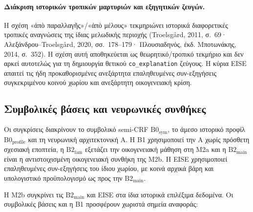 \documentclass[11pt,a4paper]{article}
\begin{document}
\paragraph{Διάκριση ιστορικών τροπικών μαρτυριών και εξηγητικών ζευγών.} Η σχέση «ἀπὸ παραλλαγῆς»/«ἀπὸ μέλους» τεκμηριώνει ιστορικά διαφορετικές τροπικές αναγνώσεις της ίδιας μελωδικής περιοχής (Troelsgård, 2011, σ.~69· Αλεξάνδρου--Troelsgård, 2020, σσ.~178--179· Πλουσιαδηνός, έκδ. Μποτωνάκης, 2014, σ.~352). Η σχέση αυτή αποθηκεύεται ως θεωρητικό/τροπικό τεκμήριο και δεν αρκεί αυτοτελώς για τη δημιουργία θετικού \texttt{co\_explanation} ζεύγους. Η κύρια EISE απαιτεί τις ήδη προκαθορισμένες ανεξάρτητα επαληθευμένες συν-εξηγήσεις συγκεκριμένου κοινού χωρίου και ανεξάρτητη οικογενειακή κρίση.

\subsection{Συμβολικές βάσεις και νευρωνικές συνθήκες}

Οι συγκρίσεις διακρίνουν το συμβολικό semi-CRF $\mathrm{B0}_{\mathrm{sym}}$, το άμεσο ιστορικό προφίλ $\mathrm{B0}_{\mathrm{profile}}$ και τη νευρωνική αρχιτεκτονική A. Η B1 χρησιμοποιεί την A χωρίς πρόσθετη σχεσιακή εποπτεία, η $\mathrm{B2}_{\mathrm{fam}}$ εξετάζει την οικογενειακή μάθηση στη Μ2a και η $\mathrm{B2}_{\mathrm{main}}$ είναι η αντιστοιχισμένη οικογενειακή συνθήκη της Μ2b. Η EISE χρησιμοποιεί επαληθευμένες συν-εξηγήσεις του ίδιου χωρίου, με κοινά αρχικά βάρη και υπολογιστικό προϋπολογισμό ως προς την $\mathrm{B2}_{\mathrm{main}}$.

Η Μ2b συγκρίνει τις $\mathrm{B2}_{\mathrm{main}}$ και EISE στα ίδια ιστορικά επιλέξιμα δεδομένα. Οι συμβολικές βάσεις και η B1 προσφέρουν χωριστά σημεία αναφοράς:
\end{document}
